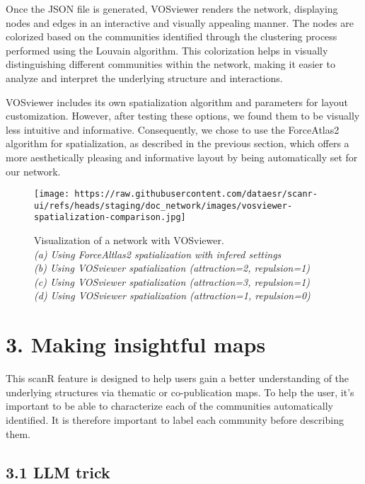 \documentclass[
]{article}
\begin{document}
Once the JSON file is generated, VOSviewer renders the network,
displaying nodes and edges in an interactive and visually appealing
manner. The nodes are colorized based on the communities identified
through the clustering process performed using the Louvain algorithm.
This colorization helps in visually distinguishing different communities
within the network, making it easier to analyze and interpret the
underlying structure and interactions.

VOSviewer includes its own spatialization algorithm and parameters for
layout customization. However, after testing these options, we found
them to be visually less intuitive and informative. Consequently, we
chose to use the ForceAtlas2 algorithm for spatialization, as described
in the previous section, which offers a more aesthetically pleasing and
informative layout by being automatically set for our network.

\begin{figure}
\centering
\texttt{[image: https://raw.githubusercontent.com/dataesr/scanr-ui/refs/heads/staging/doc\_network/images/vosviewer-spatialization-comparison.jpg]}
\caption{Visualization of a network with VOSviewer.\\
\emph{(a) Using ForceAltlas2 spatialization with infered settings\\
(b) Using VOSviewer spatialization (attraction=2, repulsion=1)\\
(c) Using VOSviewer spatialization (attraction=3, repulsion=1)\\
(d) Using VOSviewer spatialization (attraction=1, repulsion=0)}}
\end{figure}

\hypertarget{making-insightful-maps}{%
\section{3. Making insightful maps}\label{making-insightful-maps}}

This scanR feature is designed to help users gain a better understanding
of the underlying structures via thematic or co-publication maps. To
help the user, it's important to be able to characterize each of the
communities automatically identified. It is therefore important to label
each community before describing them.

\hypertarget{llm-trick}{%
\subsection{3.1 LLM trick}\label{llm-trick}}
\end{document}
